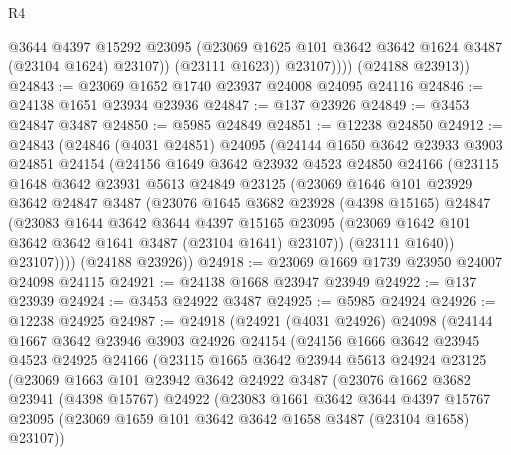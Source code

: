 \begin{lexlean}{R4}
\begin{coremodule}
                  @3644
                  @4397
                  @15292
                  @23095
                  (@23069 @1625 @101 @3642 @3642 @1624 @3487 (@23104 @1624) @23107))
                (@23111 @1623))
              @23107))))
      (@24188 @23913))
@24843 := @23069 @1652 @1740 @23937 @24008 @24095 @24116
@24846 := @24138 @1651 @23934 @23936
@24847 := @137 @23926
@24849 := @3453 @24847 @3487
@24850 := @5985 @24849
@24851 := @12238 @24850
@24912 := @24843
    (@24846
      (@4031 @24851)
      @24095
      (@24144
        @1650
        @3642
        @23933
        @3903
        @24851
        @24154
        (@24156
          @1649
          @3642
          @23932
          @4523
          @24850
          @24166
          (@23115
            @1648
            @3642
            @23931
            @5613
            @24849
            @23125
            (@23069
              @1646
              @101
              @23929
              @3642
              @24847
              @3487
              (@23076
                @1645
                @3682
                @23928
                (@4398 @15165)
                @24847
                (@23083
                  @1644
                  @3642
                  @3644
                  @4397
                  @15165
                  @23095
                  (@23069 @1642 @101 @3642 @3642 @1641 @3487 (@23104 @1641) @23107))
                (@23111 @1640))
              @23107))))
      (@24188 @23926))
@24918 := @23069 @1669 @1739 @23950 @24007 @24098 @24115
@24921 := @24138 @1668 @23947 @23949
@24922 := @137 @23939
@24924 := @3453 @24922 @3487
@24925 := @5985 @24924
@24926 := @12238 @24925
@24987 := @24918
    (@24921
      (@4031 @24926)
      @24098
      (@24144
        @1667
        @3642
        @23946
        @3903
        @24926
        @24154
        (@24156
          @1666
          @3642
          @23945
          @4523
          @24925
          @24166
          (@23115
            @1665
            @3642
            @23944
            @5613
            @24924
            @23125
            (@23069
              @1663
              @101
              @23942
              @3642
              @24922
              @3487
              (@23076
                @1662
                @3682
                @23941
                (@4398 @15767)
                @24922
                (@23083
                  @1661
                  @3642
                  @3644
                  @4397
                  @15767
                  @23095
                  (@23069 @1659 @101 @3642 @3642 @1658 @3487 (@23104 @1658) @23107))

\end{coremodule}
\end{lexlean}

